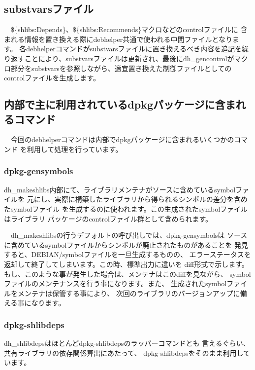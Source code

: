 \documentclass[mingoth,a4paper]{jsarticle}
\begin{document}
\subsection{substvarsファイル}

　\$\{shlibs:Depends\}、\$\{shlibs:Recommends\}マクロなどのcontrolファイルに
含まれる情報を置き換える際にdebhelper共通で使われる中間ファイルとなります。
各debhelperコマンドがsubstvarsファイルに置き換えるべき内容を追記を繰り返すことにより、substvarsファイルは更新され、最後にdh\_gencontrolがマクロ部分をsubstvarsを参照しながら、適宜置き換えた制御ファイルとしてのcontrolファイルを生成します。

\subsection{内部で主に利用されているdpkgパッケージに含まれるコマンド}

　今回のdebhelperコマンドは内部でdpkgパッケージに含まれるいくつかのコマンド
を利用して処理を行っています。

\subsubsection{dpkg-gensymbols}

 dh\_makeshlibs内部にて、ライブラリメンテナがソースに含めているsymbolファイルを
元にし、実際に構築したライブラリから得られるシンボルの差分を含めたsymbolファイル
を生成するのに使われます。この生成されたsymbolファイルはライブラリ
パッケージのcontrolファイル群として含められます。

　dh\_makeshlibsの行うデフォルトの呼び出しでは、dpkg-gensymbolsは
ソースに含めているsymbolファイルからシンボルが廃止されたものがあることを
発見すると、DEBIAN/symbolファイルを一旦生成するものの、
エラーステータスを返却して終了してしまいます。この時、標準出力に違いを
diff形式で示します。もし、このような事が発生した場合は、メンテナはこのdiffを見ながら、
symbolファイルのメンテナンスを行う事になります。また、
生成されたsymbolファイルをメンテナは保管する事により、
次回のライブラリのバージョンアップに備える事になります。

\subsubsection{dpkg-shlibdeps}

 dh\_shlibdepsはほとんどdpkg-shlibdepsのラッパーコマンドとも
言えるぐらい、共有ライブラリの依存関係算出にあたって、
dpkg-shlibdepsをそのまま利用しています。
\end{document}
